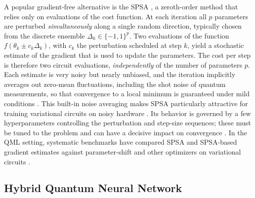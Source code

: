 \documentclass[aps,10pt,groupedaddress,prx,superscriptaddress,twocolumn,balancelastpage, tightenlines]{revtex4-2}
\theoremstyle{plain}  %
\begin{document}
A popular gradient-free alternative is the \gls{SPSA} \cite{spall1992multivariate, spall1998implementation}, a zeroth-order method that relies only on evaluations of the cost function. At each iteration all $p$ parameters are perturbed \emph{simultaneously} along a single random direction, typically chosen from the discrete ensemble $\Delta_k\in\{-1,1\}^p$. Two evaluations of the function $f(\theta_k \pm c_k \Delta_k)$, with $c_k$ the perturbation scheduled at step $k$, yield a stochastic estimate of the gradient that is used to update the parameters. The cost per step is therefore two circuit evaluations, \emph{independently} of the number of parameters $p$. Each estimate is very noisy but nearly unbiased, and the iteration implicitly averages out zero-mean fluctuations, including the shot noise of quantum measurements, so that convergence to a local minimum is guaranteed under mild conditions \cite{spall1992multivariate}. This built-in noise averaging makes SPSA particularly attractive for training variational circuits on noisy hardware \cite{Kandala2017HardwareefficientVQ}. Its behavior is governed by a few hyperparameters controlling the perturbation and step-size sequences; these must be tuned to the problem and can have a decisive impact on convergence \cite{spall1998implementation, bonetmonroig2023performance}. In the QML setting, systematic benchmarks have compared SPSA and SPSA-based gradient estimates against parameter-shift and other optimizers on variational circuits \cite{ wiedmann2023empirical}.

\subsection{Hybrid Quantum Neural Network} 
\end{document}
